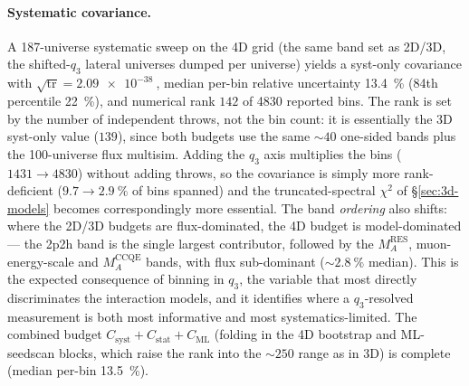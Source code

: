 \paragraph{Systematic covariance.} A 187-universe systematic sweep on the 4D grid
(the same band set as 2D/3D, the shifted-$q_{3}$ lateral universes dumped per
universe) yields a syst-only covariance with
$\sqrt{\operatorname{tr}}=\SI{2.09e-38}{}$, median per-bin relative uncertainty
\SI{13.4}{\percent} (84th percentile \SI{22}{\percent}), and numerical rank $142$
of 4830 reported bins. The rank is set by the number of independent throws, not
the bin count: it is essentially the 3D syst-only value ($139$), since both
budgets use the same $\sim\!40$ one-sided bands plus the 100-universe flux
multisim. Adding the $q_{3}$ axis multiplies the bins ($1431\!\to\!4830$) without
adding throws, so the covariance is simply more rank-deficient
($9.7\!\to\!\SI{2.9}{\percent}$ of bins spanned) and the truncated-spectral
$\chi^{2}$ of \S\ref{sec:3d-models} becomes correspondingly more essential. The
band \emph{ordering} also shifts: where the 2D/3D budgets are flux-dominated, the
4D budget is model-dominated --- the 2p2h band is the single largest contributor,
followed by the $M_{A}^{\mathrm{RES}}$, muon-energy-scale and
$M_{A}^{\mathrm{CCQE}}$ bands, with flux sub-dominant ($\sim\SI{2.8}{\percent}$
median). This is the expected consequence of binning in $q_{3}$, the variable
that most directly discriminates the interaction models, and it identifies where a
$q_{3}$-resolved measurement is both most informative and most
systematics-limited. The combined budget
$C_{\mathrm{syst}}+C_{\mathrm{stat}}+C_{\mathrm{ML}}$ (folding in the 4D bootstrap
and ML-seedscan blocks, which raise the rank into the $\sim\!250$ range as in 3D)
is complete (median per-bin \SI{13.5}{\percent}).

